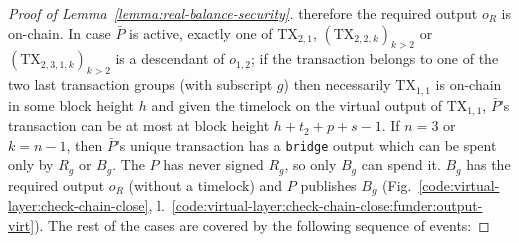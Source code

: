 \begin{proof}[Proof of Lemma~\ref{lemma:real-balance-security}]
  therefore the required output $o_R$ is on-chain. In
  case $\bar{P}$ is active, exactly one of $\mathrm{TX}_{2, 1}$,
  $(\mathrm{TX}_{2, 2, k})_{k > 2}$ or $(\mathrm{TX}_{2, 3, 1, k})_{k > 2}$ is a
  descendant of $o_{1, 2}$; if the transaction belongs to one of the two last
  transaction groups (with subscript $g$) then necessarily $\mathrm{TX}_{1, 1}$ is on-chain in some
  block height $h$ and given the timelock on the virtual output of
  $\mathrm{TX}_{1, 1}$, $\bar{P}$'s transaction can be at most at block height
  $h + t_2 + p + s - 1$. If $n=3$ or $k=n-1$, then $\bar{P}$'s unique
  transaction has a \texttt{bridge} output which can be spent only by $R_g$ or
  $B_g$. The $P$ has never signed $R_g$, so only $B_g$ can spend it. $B_g$ has
  the required output $o_R$ (without a timelock) and $P$ publishes $B_g$
  (Fig.~\ref{code:virtual-layer:check-chain-close},
  l.~\ref{code:virtual-layer:check-chain-close:funder:output-virt}). The rest of
  the cases are covered by the following sequence of events:


\end{proof}
